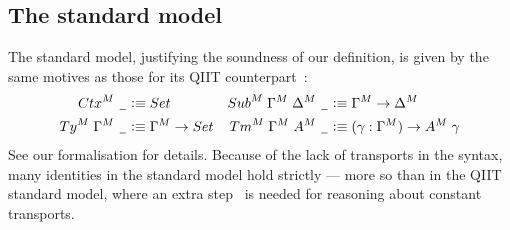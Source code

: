 \documentclass[a4paper,UKenglish,numberwithinsect,cleveref,thm-restate]{lipics-v2021}
\begin{document}
\subsection{The standard model} \label{subsec:std-model}
The standard model, justifying the soundness of our definition, is given by the same motives as those for its QIIT counterpart~\cite[Section~4]{Altenkirch2016a}:
\begin{align*}
  \Ctx^M\;\nameless          & \defeq \Set              & \Sub^M\;\Gamma^M\;\Delta^M\;\nameless & \defeq \Gamma^M \to \Delta^M \\
  \Ty^M\;\Gamma^M\;\nameless & \defeq \Gamma^M \to \Set & \Tm^M\;\Gamma^M\;A^M\;\nameless & \defeq (\gamma : \Gamma^M) \to A^M\;\gamma
\end{align*}
%
See our \Agda formalisation for details.
Because of the lack of transports in the syntax, many identities in the standard model hold strictly --- more so than in the QIIT standard model, where an extra step~\cite[Lemma~2.3.5]{UFP2013} is needed for reasoning about constant transports.
\end{document}
